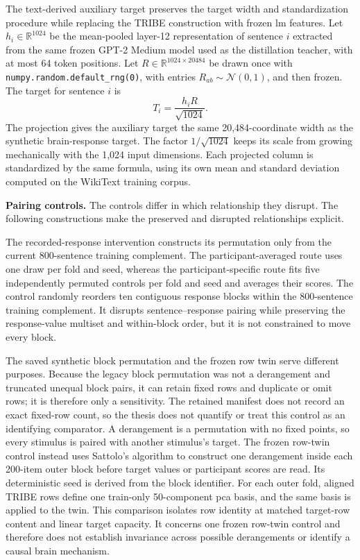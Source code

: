 The text-derived auxiliary target preserves the target width and standardization procedure while replacing the TRIBE construction with frozen \ac{lm} features.
Let $h_i\in\mathbb{R}^{1024}$ be the mean-pooled layer-12 representation of sentence $i$ extracted from the same frozen GPT-2 Medium model used as the distillation teacher, with at most 64 token positions.
Let $R\in\mathbb{R}^{1024\times 20484}$ be drawn once with \texttt{numpy.random.default\_rng(0)}, with entries $R_{ab}\sim\mathcal{N}(0,1)$, and then frozen.
The target for sentence $i$ is
\[
  T_i=\frac{h_iR}{\sqrt{1024}}.
\]
The projection gives the auxiliary target the same 20,484-coordinate width as the synthetic brain-response target.
The factor $1/\sqrt{1024}$ keeps its scale from growing mechanically with the 1,024 input dimensions.
Each projected column is standardized by the same formula, using its own mean and standard deviation computed on the WikiText training corpus. 

\noindent\textbf{Pairing controls.}
The controls differ in which relationship they disrupt.
The following constructions make the preserved and disrupted relationships explicit.

The recorded-response intervention constructs its permutation only from the current 800-sentence training complement.
The participant-averaged route uses one draw per fold and seed, whereas the participant-specific route fits five independently permuted controls per fold and seed and averages their scores.
The control randomly reorders ten contiguous response blocks within the 800-sentence training complement.
It disrupts sentence--response pairing while preserving the response-value multiset and within-block order, but it is not constrained to move every block. 

The saved synthetic block permutation and the frozen row twin serve different purposes.
Because the legacy block permutation was not a derangement and truncated unequal block pairs, it can retain fixed rows and duplicate or omit rows; it is therefore only a sensitivity.
The retained manifest does not record an exact fixed-row count, so the thesis does not quantify or treat this control as an identifying comparator.
A derangement is a permutation with no fixed points, so every stimulus is paired with another stimulus's target.
The frozen row-twin control instead uses Sattolo's algorithm to construct one derangement inside each 200-item outer block before target values or participant scores are read.
Its deterministic seed is derived from the block identifier.
For each outer fold, aligned TRIBE rows define one train-only 50-component \ac{pca} basis, and the same basis is applied to the twin.
This comparison isolates row identity at matched target-row content and linear target capacity.
It concerns one frozen row-twin control and therefore does not establish invariance across possible derangements or identify a causal brain mechanism. 

